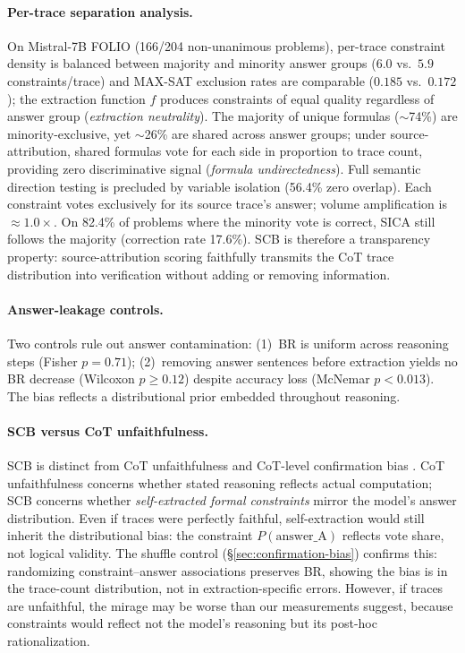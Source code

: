 \paragraph{Per-trace separation analysis.}
On Mistral-7B FOLIO (166/204 non-unanimous problems), per-trace constraint density is balanced between majority and minority answer groups ($6.0$ vs.\ $5.9$ constraints/trace) and MAX-SAT exclusion rates are comparable ($0.185$ vs.\ $0.172$); the extraction function $f$ produces constraints of equal quality regardless of answer group (\emph{extraction neutrality}).
The majority of unique formulas (${\sim}$74\%) are minority-exclusive, yet ${\sim}$26\% are shared across answer groups; under source-attribution, shared formulas vote for each side in proportion to trace count, providing zero discriminative signal (\emph{formula undirectedness}). Full semantic direction testing is precluded by variable isolation (56.4\% zero overlap).
Each constraint votes exclusively for its source trace's answer; volume amplification is ${\approx}1.0\times$. On 82.4\% of problems where the minority vote is correct, SICA still follows the majority (correction rate 17.6\%). SCB is therefore a transparency property: source-attribution scoring faithfully transmits the CoT trace distribution into verification without adding or removing information.

\paragraph{Answer-leakage controls.}
Two controls rule out answer contamination: (1)~BR is uniform across reasoning steps (Fisher $p = 0.71$); (2)~removing answer sentences before extraction yields no BR decrease (Wilcoxon $p \geq 0.12$) despite accuracy loss (McNemar $p < 0.013$). The bias reflects a distributional prior embedded throughout reasoning.

\paragraph{SCB versus CoT unfaithfulness.}
SCB is distinct from CoT unfaithfulness \citep{turpin2023language} and CoT-level confirmation bias \citep{wan2025unveiling, jhaveri2026failing}. CoT unfaithfulness concerns whether stated reasoning reflects actual computation; SCB concerns whether \emph{self-extracted formal constraints} mirror the model's answer distribution. Even if traces were perfectly faithful, self-extraction would still inherit the distributional bias: the constraint $P(\text{answer\_A})$ reflects vote share, not logical validity. The shuffle control (\S\ref{sec:confirmation-bias}) confirms this: randomizing constraint--answer associations preserves BR, showing the bias is in the trace-count distribution, not in extraction-specific errors. However, if traces are unfaithful, the mirage may be worse than our measurements suggest, because constraints would reflect not the model's reasoning but its post-hoc rationalization.

